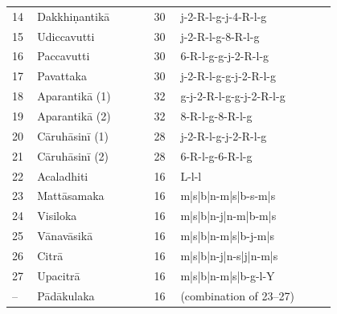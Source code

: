 {\begin{longtable}[c]{p{0.04\linewidth}p{0.30\linewidth}p{0.06\linewidth}p{0.40\linewidth}}
14 & Dakkhiṇantikā & 30 & j-2-R-l-g-j-4-R-l-g \\
15 & Udiccavutti & 30 & j-2-R-l-g-8-R-l-g \\
16 & Paccavutti & 30 & 6-R-l-g-g-j-2-R-l-g \\
17 & Pavattaka & 30 & j-2-R-l-g-g-j-2-R-l-g \\
18 & Aparantikā (1) & 32 & g-j-2-R-l-g-g-j-2-R-l-g \\
19 & Aparantikā (2) & 32 & 8-R-l-g-8-R-l-g \\
20 & Cāruhāsinī (1) & 28 & j-2-R-l-g-j-2-R-l-g \\
21 & Cāruhāsinī (2) & 28 & 6-R-l-g-6-R-l-g \\
22 & Acaladhiti & 16 & L-l-l \\
23 & Mattāsamaka & 16 & m|s|b|n-m|s|b-s-m|s \\
24 & Visiloka & 16 & m|s|b|n-j|n-m|b-m|s \\
25 & Vānavāsikā & 16 & m|s|b|n-m|s|b-j-m|s \\
26 & Citrā & 16 & m|s|b|n-j|n-s|j|n-m|s \\
27 & Upacitrā & 16 & m|s|b|n-m|s|b-g-l-Y \\
-- & Pādākulaka & 16 & (combination of 23--27) \\
\end{longtable}
}

